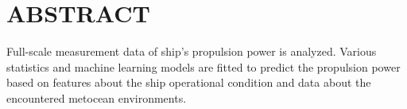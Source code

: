 \section*{ABSTRACT}\label{abstract}
Full-scale measurement data of ship's propulsion power is analyzed.
Various statistics and machine learning models are fitted to predict the
propulsion power based on features about the ship operational condition
and data about the encountered metocean environments.
